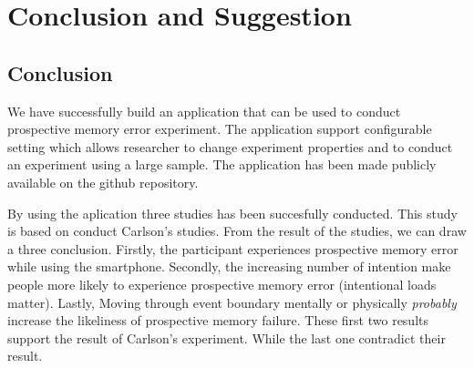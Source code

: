 \chapter{Conclusion and Suggestion}
\section{Conclusion}


We have successfully build an application that can be used to conduct prospective memory error experiment.
The application support configurable setting which allows researcher to change experiment properties and to conduct
an experiment using a large sample. The application has been made publicly available on the github repository.

By using the aplication three studies has been succesfully conducted.
This study is based on conduct Carlson's studies. From the result of the studies,
we can draw a three conclusion. Firstly, the participant experiences prospective memory error while using the smartphone.
Secondly, the increasing number of intention make people more likely to experience prospective memory error (intentional loads matter).
Lastly, Moving through event boundary mentally or physically \textit{probably} increase the likeliness of prospective memory failure.
These first two results support the result of Carlson's experiment. While the last one
contradict their result.



